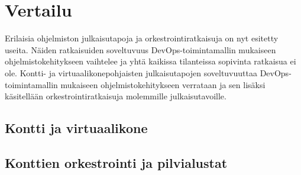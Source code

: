 \chapter{Vertailu\label{comparisons}}


Erilaisia ohjelmiston julkaisutapoja ja orkestrointiratkaisuja on nyt esitetty useita.
Näiden ratkaisuiden soveltuvuus DevOps-toimintamallin mukaiseen ohjelmistokehitykseen vaihtelee ja yhtä kaikissa tilanteissa sopivinta ratkaisua ei ole.
Kontti- ja virtuaalikonepohjaisten julkaisutapojen soveltuvuuttaa DevOps-toimintamallin mukaiseen ohjelmistokehitykseen verrataan ja sen lisäksi käsitellään orkestrointiratkaisuja molemmille julkaisutavoille. 

\section{Kontti ja virtuaalikone}

\section{Konttien orkestrointi ja pilvialustat}
